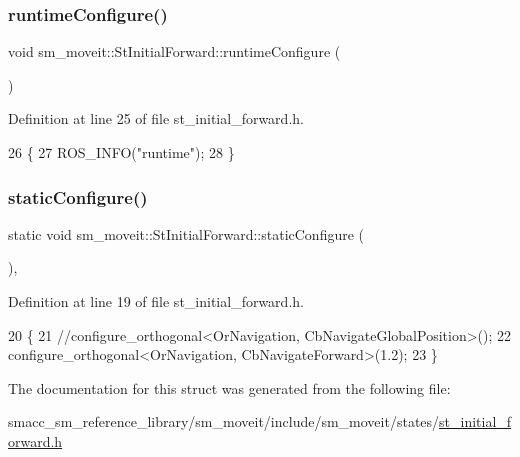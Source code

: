 \subsubsection{\texorpdfstring{runtime\+Configure()}{runtimeConfigure()}}
{\footnotesize\ttfamily void sm\+\_\+moveit\+::\+St\+Initial\+Forward\+::runtime\+Configure (\begin{DoxyParamCaption}{ }\end{DoxyParamCaption})\hspace{0.3cm}{\ttfamily [inline]}}



Definition at line 25 of file st\+\_\+initial\+\_\+forward.\+h.


\begin{DoxyCode}
26     \{
27         ROS\_INFO(\textcolor{stringliteral}{"runtime"});
28     \}
\end{DoxyCode}
\mbox{\label{structsm__moveit_1_1StInitialForward_a573303f50ed120314581e88a366db135}} 
\subsubsection{\texorpdfstring{static\+Configure()}{staticConfigure()}}
{\footnotesize\ttfamily static void sm\+\_\+moveit\+::\+St\+Initial\+Forward\+::static\+Configure (\begin{DoxyParamCaption}{ }\end{DoxyParamCaption})\hspace{0.3cm}{\ttfamily [inline]}, {\ttfamily [static]}}



Definition at line 19 of file st\+\_\+initial\+\_\+forward.\+h.


\begin{DoxyCode}
20     \{
21         \textcolor{comment}{//configure\_orthogonal<OrNavigation, CbNavigateGlobalPosition>();}
22         configure\_orthogonal<OrNavigation, CbNavigateForward>(1.2);
23     \}
\end{DoxyCode}


The documentation for this struct was generated from the following file\+:\begin{DoxyCompactItemize}
\item 
smacc\+\_\+sm\+\_\+reference\+\_\+library/sm\+\_\+moveit/include/sm\+\_\+moveit/states/\hyperlink{st__initial__forward_8h}{st\+\_\+initial\+\_\+forward.\+h}\end{DoxyCompactItemize}
